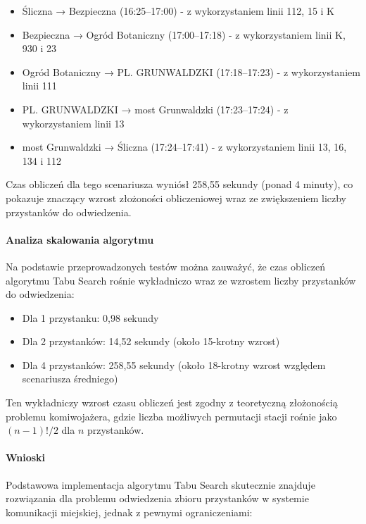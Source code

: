 \documentclass[12pt,a4paper]{article}
\begin{document}
\begin{itemize}
    \item Śliczna → Bezpieczna (16:25--17:00) - z wykorzystaniem linii 112, 15 i K
    \item Bezpieczna → Ogród Botaniczny (17:00--17:18) - z wykorzystaniem linii K, 930 i 23 
    \item Ogród Botaniczny → PL. GRUNWALDZKI (17:18--17:23) - z wykorzystaniem linii 111
    \item PL. GRUNWALDZKI → most Grunwaldzki (17:23--17:24) - z wykorzystaniem linii 13
    \item most Grunwaldzki → Śliczna (17:24--17:41) - z wykorzystaniem linii 13, 16, 134 i 112
\end{itemize}

Czas obliczeń dla tego scenariusza wyniósł 258,55 sekundy (ponad 4 minuty), co pokazuje znaczący wzrost złożoności obliczeniowej wraz ze zwiększeniem liczby przystanków do odwiedzenia.

\paragraph{Analiza skalowania algorytmu}
Na podstawie przeprowadzonych testów można zauważyć, że czas obliczeń algorytmu Tabu Search rośnie wykładniczo wraz ze wzrostem liczby przystanków do odwiedzenia:

\begin{itemize}
    \item Dla 1 przystanku: 0,98 sekundy
    \item Dla 2 przystanków: 14,52 sekundy (około 15-krotny wzrost)
    \item Dla 4 przystanków: 258,55 sekundy (około 18-krotny wzrost względem scenariusza średniego)
\end{itemize}

Ten wykładniczy wzrost czasu obliczeń jest zgodny z teoretyczną złożonością problemu komiwojażera, gdzie liczba możliwych permutacji stacji rośnie jako $(n-1)!/2$ dla $n$ przystanków.

\paragraph{Wnioski}
Podstawowa implementacja algorytmu Tabu Search skutecznie znajduje rozwiązania dla problemu odwiedzenia zbioru przystanków w systemie komunikacji miejskiej, jednak z pewnymi ograniczeniami:
\end{document}
